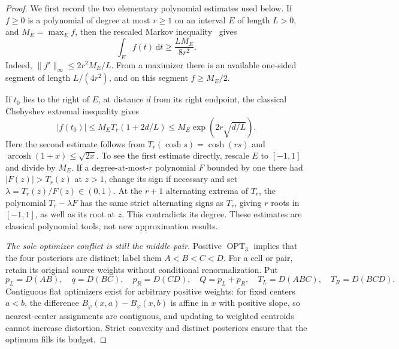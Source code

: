 \begin{proof}
We first record the two elementary polynomial estimates used below. If
$f\ge0$ is a polynomial of degree at most $r\ge1$ on an interval $E$ of
length $L>0$, and $M_E=\max_E f$, then the rescaled Markov inequality~\cite{shadrin} gives
\begin{equation}
 \int_E f(t)\,\mathrm dt\ge\frac{L M_E}{8r^2}.
 \label{eq:weighted-markov-mass}
\end{equation}
Indeed, $\|f'\|_\infty\le2r^2M_E/L$. From a maximizer there is an
available one-sided segment of length $L/(4r^2)$, and on this segment
$f\ge M_E/2$.

If $t_0$ lies to the right of $E$, at distance $d$ from its right endpoint,
the classical Chebyshev extremal inequality gives
\begin{equation}
 |f(t_0)|\le M_E T_r(1+2d/L)
 \le M_E\exp\left(2r\sqrt{d/L}\right).
 \label{eq:weighted-cheb-extrapolation}
\end{equation}
Here the second estimate follows from
$T_r(\cosh s)=\cosh(rs)$ and
$\operatorname{arcosh}(1+x)\le\sqrt{2x}$. To see the first estimate
directly, rescale $E$ to $[-1,1]$ and divide by $M_E$. If a degree-at-most-$r$
polynomial $F$ bounded by one there had
$|F(z)|>T_r(z)$ at $z>1$, change its sign if necessary and set
$\lambda=T_r(z)/F(z)\in(0,1)$. At the $r+1$ alternating extrema of $T_r$,
the polynomial $T_r-\lambda F$ has the same strict alternating signs as
$T_r$, giving $r$ roots in $[-1,1]$, as well as its root at $z$.
This contradicts its degree. These estimates are classical polynomial
tools, not new approximation results.

\emph{The sole optimizer conflict is still the middle pair.}
Positive $\operatorname{OPT}_3$ implies that the four posteriors are
distinct; label them $A<B<C<D$. For a cell or pair, retain its original
source weights without conditional renormalization. Put
\[
 p_L=D(AB),\quad q=D(BC),\quad p_R=D(CD),\quad
 Q=p_L+p_R,\quad T_L=D(ABC),\quad T_R=D(BCD).
\]
Contiguous flat optimizers exist for arbitrary positive weights: for fixed
centers $a<b$, the difference $B_\varphi(x,a)-B_\varphi(x,b)$ is affine
in $x$ with positive slope, so nearest-center assignments are contiguous,
and updating to weighted centroids cannot increase distortion. Strict
convexity and distinct posteriors ensure that the optimum fills its budget.


\end{proof}
